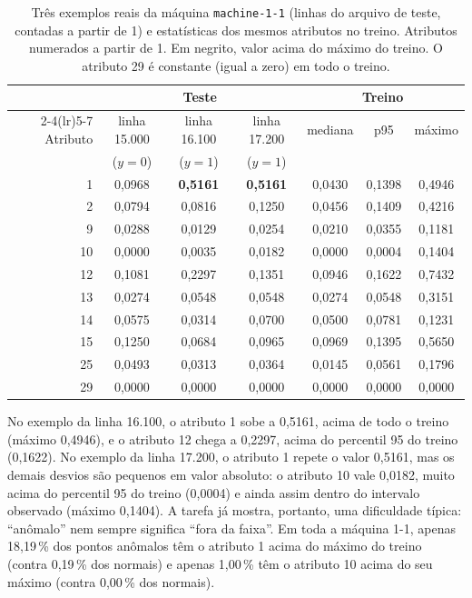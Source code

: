 \begin{table}[htbp]
\centering
\caption{Três exemplos reais da máquina \texttt{machine-1-1} (linhas do arquivo de teste, contadas a partir de
1) e estatísticas dos mesmos atributos no treino. Atributos numerados a partir de 1. Em negrito, valor acima do
máximo do treino. O atributo 29 é constante (igual a zero) em todo o treino.}
\label{tab:exemplos}
\small
\setlength{\tabcolsep}{5pt}
\begin{tabular}{rcccccc}
\toprule
 & \multicolumn{3}{c}{Teste} & \multicolumn{3}{c}{Treino}\\
\cmidrule(lr){2-4}\cmidrule(lr){5-7}
Atributo & linha 15.000 & linha 16.100 & linha 17.200 & mediana & p95 & máximo\\
 & ($y=0$) & ($y=1$) & ($y=1$) & & &\\
\midrule
1  & 0,0968 & \textbf{0,5161} & \textbf{0,5161} & 0,0430 & 0,1398 & 0,4946\\
2  & 0,0794 & 0,0816 & 0,1250 & 0,0456 & 0,1409 & 0,4216\\
9  & 0,0288 & 0,0129 & 0,0254 & 0,0210 & 0,0355 & 0,1181\\
10 & 0,0000 & 0,0035 & 0,0182 & 0,0000 & 0,0004 & 0,1404\\
12 & 0,1081 & 0,2297 & 0,1351 & 0,0946 & 0,1622 & 0,7432\\
13 & 0,0274 & 0,0548 & 0,0548 & 0,0274 & 0,0548 & 0,3151\\
14 & 0,0575 & 0,0314 & 0,0700 & 0,0500 & 0,0781 & 0,1231\\
15 & 0,1250 & 0,0684 & 0,0965 & 0,0969 & 0,1395 & 0,5650\\
25 & 0,0493 & 0,0313 & 0,0364 & 0,0145 & 0,0561 & 0,1796\\
29 & 0,0000 & 0,0000 & 0,0000 & 0,0000 & 0,0000 & 0,0000\\
\bottomrule
\end{tabular}
\end{table}

No exemplo da linha 16.100, o atributo 1 sobe a 0,5161, acima de todo o treino (máximo 0,4946), e o atributo 12
chega a 0,2297, acima do percentil 95 do treino (0,1622). No exemplo da linha 17.200, o atributo 1 repete o
valor 0,5161, mas os demais desvios são pequenos em valor absoluto: o atributo 10 vale 0,0182, muito acima do
percentil 95 do treino (0,0004) e ainda assim dentro do intervalo observado (máximo 0,1404). A tarefa já
mostra, portanto, uma dificuldade típica: ``anômalo'' nem sempre significa ``fora da faixa''. Em toda a
máquina 1-1, apenas 18,19\,\% dos pontos anômalos têm o atributo 1 acima do máximo do treino (contra 0,19\,\%
dos normais) e apenas 1,00\,\% têm o atributo 10 acima do seu máximo (contra 0,00\,\% dos normais).

